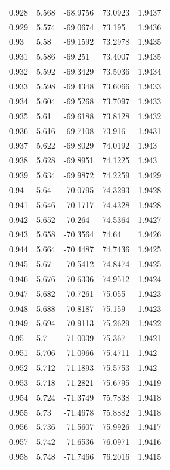 \begin{tabular}{lllll}
0.928 & 5.568 & -68.9756 & 73.0923 & 1.9437 \\
0.929 & 5.574 & -69.0674 & 73.195 & 1.9436 \\
0.93 & 5.58 & -69.1592 & 73.2978 & 1.9435 \\
0.931 & 5.586 & -69.251 & 73.4007 & 1.9435 \\
0.932 & 5.592 & -69.3429 & 73.5036 & 1.9434 \\
0.933 & 5.598 & -69.4348 & 73.6066 & 1.9433 \\
0.934 & 5.604 & -69.5268 & 73.7097 & 1.9433 \\
0.935 & 5.61 & -69.6188 & 73.8128 & 1.9432 \\
0.936 & 5.616 & -69.7108 & 73.916 & 1.9431 \\
0.937 & 5.622 & -69.8029 & 74.0192 & 1.943 \\
0.938 & 5.628 & -69.8951 & 74.1225 & 1.943 \\
0.939 & 5.634 & -69.9872 & 74.2259 & 1.9429 \\
0.94 & 5.64 & -70.0795 & 74.3293 & 1.9428 \\
0.941 & 5.646 & -70.1717 & 74.4328 & 1.9428 \\
0.942 & 5.652 & -70.264 & 74.5364 & 1.9427 \\
0.943 & 5.658 & -70.3564 & 74.64 & 1.9426 \\
0.944 & 5.664 & -70.4487 & 74.7436 & 1.9425 \\
0.945 & 5.67 & -70.5412 & 74.8474 & 1.9425 \\
0.946 & 5.676 & -70.6336 & 74.9512 & 1.9424 \\
0.947 & 5.682 & -70.7261 & 75.055 & 1.9423 \\
0.948 & 5.688 & -70.8187 & 75.159 & 1.9423 \\
0.949 & 5.694 & -70.9113 & 75.2629 & 1.9422 \\
0.95 & 5.7 & -71.0039 & 75.367 & 1.9421 \\
0.951 & 5.706 & -71.0966 & 75.4711 & 1.942 \\
0.952 & 5.712 & -71.1893 & 75.5753 & 1.942 \\
0.953 & 5.718 & -71.2821 & 75.6795 & 1.9419 \\
0.954 & 5.724 & -71.3749 & 75.7838 & 1.9418 \\
0.955 & 5.73 & -71.4678 & 75.8882 & 1.9418 \\
0.956 & 5.736 & -71.5607 & 75.9926 & 1.9417 \\
0.957 & 5.742 & -71.6536 & 76.0971 & 1.9416 \\
0.958 & 5.748 & -71.7466 & 76.2016 & 1.9415 \\

\end{tabular}
